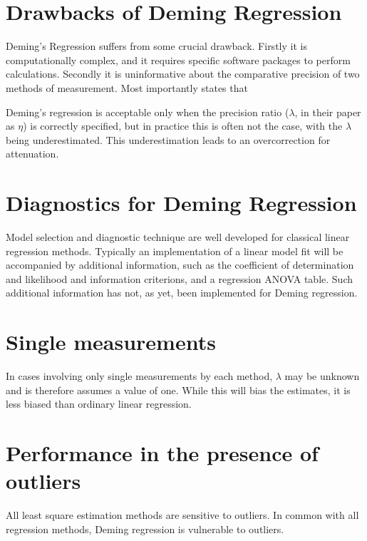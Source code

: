 \documentclass[12pt, a4paper]{report}
\theoremstyle{plain}
\theoremstyle{definition}
\theoremstyle{remark}
\begin{document}
\section{Drawbacks of Deming Regression}

Deming's Regression suffers from some crucial drawback. Firstly it is computationally complex, and it requires specific software packages to perform calculations. Secondly it is uninformative
about the comparative precision of two methods of measurement. Most importantly \citet{CarollRupert} states that

Deming's regression is acceptable only when the precision ratio ($\lambda$, in their paper as $\eta$) is correctly specified, but in practice this is often not the case, with the $\lambda$ being underestimated. This underestimation leads to an overcorrection for attenuation.

\section{Diagnostics for Deming Regression}
Model selection and diagnostic technique are well developed for classical linear regression methods.
Typically an implementation of a linear model fit will be accompanied by additional information, such as the coefficient of determination and likelihood and information criterions, and a regression ANOVA table. Such additional information has not, as yet, been implemented for Deming regression.



\section{Single measurements}
In cases involving only single measurements by each method, $\lambda$ may be unknown and is therefore assumes a value of one. While this will bias the estimates, it is less biased than ordinary linear regression.



\section{Performance in the presence of outliers}
All least square estimation methods are sensitive to outliers.
In common with all regression methods, Deming regression is vulnerable to outliers. 
\end{document}
